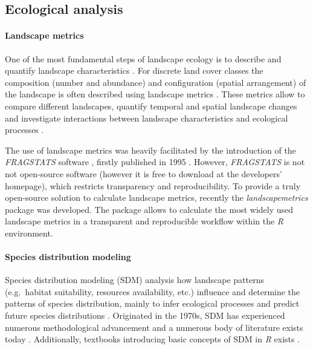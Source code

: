 \documentclass[smallextended]{svjour3}       %
\begin{document}
\hypertarget{sec:ecological_analysis}{%
\subsection{Ecological analysis}\label{sec:ecological_analysis}}

\hypertarget{sec:landscape_metrics}{%
\paragraph{Landscape metrics}\label{sec:landscape_metrics}}

One of the most fundamental steps of landscape ecology is to describe
and quantify landscape characteristics \cite{Turner2005,Lausch2015}. For
discrete land cover classes the composition (number and abundance) and
configuration (spatial arrangement) of the landscape is often described
using landscape metrics
\cite{Gustafson1998,Uuemaa2009,Uuemaa2013,Gustafson2019}. These metrics
allow to compare different landscapes, quantify temporal and spatial
landscape changes and investigate interactions between landscape
characteristics and ecological processes \cite{Uuemaa2009}.

The use of landscape metrics was heavily facilitated by the introduction
of the \emph{FRAGSTATS} software \cite{McGarigal2012}, firstly published
in 1995 \cite{Kupfer2012,Gustafson2019}. However, \emph{FRAGSTATS} is
not not open-source software (however it is free to download at the
developers' homepage), which restricts transparency and reproducibility.
To provide a truly open-source solution to calculate landscape metrics,
recently the \emph{landscapemetrics} package \cite{Hesselbarth2019a} was
developed. The package allows to calculate the most widely used
landscape metrics in a transparent and reproducible workflow within the
\emph{R} environment.

\hypertarget{sec:SDM}{%
\paragraph{Species distribution modeling}\label{sec:SDM}}

Species distribution modeling (SDM) analysis how landscape patterns
(e.g.~habitat suitability, resources availability, etc.) influence and
determine the patterns of species distribution, mainly to infer
ecological processes and predict future species distributions
\cite{Wiersma2011}. Originated in the 1970s, SDM has experienced
numerous methodological advancement and a numerous body of literature
exists today \cite{Zimmermann2010}. Additionally, textbooks introducing
basic concepts of SDM in \emph{R} exists \cite{Guisan2017,Fletcher2019}.
\end{document}
